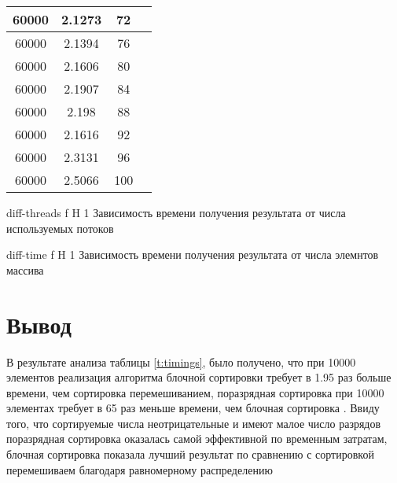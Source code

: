 \begin{table}[ht]
\begin{tabular}{|c|c|c|c|}
		60000 & 2.1273                            & 72            \\ \hline
		60000 & 2.1394                            & 76            \\ \hline
		60000 & 2.1606                            & 80            \\ \hline
		60000 & 2.1907                            & 84            \\ \hline
		60000 & 2.198                             & 88            \\ \hline
		60000 & 2.1616                            & 92            \\ \hline
		60000 & 2.3131                            & 96            \\ \hline
		60000 & 2.5066                            & 100           \\ \hline
	\end{tabular}
	\label{t:timings-threads}
\end{table}


{diff-threads} %
{f} %
{H} %
{1\textwidth} %
{Зависимость времени получения результата от числа используемых потоков} %

{diff-time} %
{f} %
{H} %
{1\textwidth} %
{Зависимость времени получения результата от числа элемнтов массива} %


\section*{Вывод}
В результате анализа таблицы \ref{t:timings}, было получено, что при 10000 элементов реализация алгоритма  блочной сортировки требует в 1.95 раз больше  времени, чем сортировка перемешиванием, поразрядная сортировка при 10000 элементах требует в 65 раз меньше времени, чем блочная сортировка . Ввиду того, что сортируемые числа неотрицательные и имеют малое число разрядов поразрядная сортировка оказалась самой эффективной по временным затратам, блочная сортировка показала лучший результат по сравнению с сортировкой перемешиваем благодаря равномерному распределению

